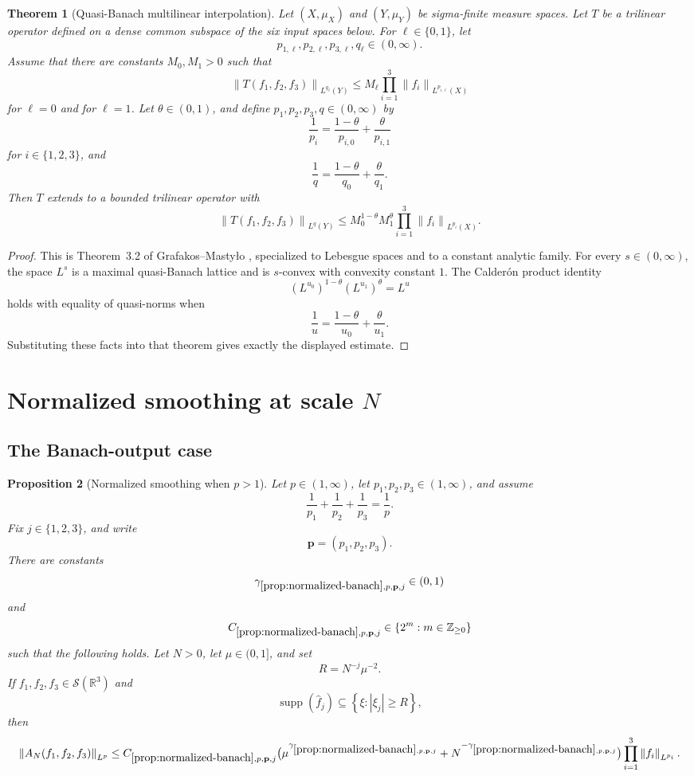 \documentclass[11pt]{article}
\newtheorem{theorem}{Theorem}[section]
\newtheorem{proposition}[theorem]{Proposition}
\newcommand{\R}{\mathbb{R}}
\newcommand{\Sch}{\mathcal{S}}
\newcommand{\supp}{\operatorname{supp}}
\newcommand{\norm}[2]{\left\lVert #1\right\rVert_{#2}}
\newcommand{\Cst}[2]{C_{\ref{#1},#2}}
\newcommand{\Gam}[2]{\gamma_{\ref{#1},#2}}
\newcommand{\abs}[1]{\left|#1\right|}
\newcommand{\set}[1]{\left\{#1\right\}}
\newcommand{\indices}{\{1,2,3\}}
\begin{document}
\begin{theorem}[Quasi-Banach multilinear interpolation]\label{thm:quasi-interpolation}
Let \((X,\mu_X)\) and \((Y,\mu_Y)\) be sigma-finite measure spaces.  Let \(T\) be a trilinear operator defined on a dense common subspace of the six input spaces below.  For \(\ell\in\{0,1\}\), let
\[
p_{1,\ell},p_{2,\ell},p_{3,\ell},q_\ell\in(0,\infty).
\]
Assume that there are constants \(M_0,M_1>0\) such that
\[
\norm{T(f_1,f_2,f_3)}{L^{q_\ell}(Y)}
\leq
M_\ell\prod_{i=1}^{3}\norm{f_i}{L^{p_{i,\ell}}(X)}
\]
for \(\ell=0\) and for \(\ell=1\).  Let \(\theta\in(0,1)\), and define \(p_1,p_2,p_3,q\in(0,\infty)\) by
\[
\frac1{p_i}=\frac{1-\theta}{p_{i,0}}+\frac\theta{p_{i,1}}
\]
for \(i\in\indices\), and
\[
\frac1q=\frac{1-\theta}{q_0}+\frac\theta{q_1}.
\]
Then \(T\) extends to a bounded trilinear operator with
\[
\norm{T(f_1,f_2,f_3)}{L^q(Y)}
\leq
M_0^{1-\theta}M_1^\theta
\prod_{i=1}^{3}\norm{f_i}{L^{p_i}(X)}.
\]
\end{theorem}

\begin{proof}
This is Theorem~3.2 of Grafakos--Masty\l o \cite[Theorem~3.2]{GrafakosMastylo}, specialized to Lebesgue spaces and to a constant analytic family.  For every \(s\in(0,\infty)\), the space \(L^s\) is a maximal quasi-Banach lattice and is \(s\)-convex with convexity constant \(1\).  The Calder\'on product identity
\[
(L^{u_0})^{1-\theta}(L^{u_1})^\theta=L^u
\]
holds with equality of quasi-norms when
\[
\frac1u=\frac{1-\theta}{u_0}+\frac\theta{u_1}.
\]
Substituting these facts into that theorem gives exactly the displayed estimate.
\end{proof}

\section{Normalized smoothing at scale \(N\)}

\subsection{The Banach-output case}

\begin{proposition}[Normalized smoothing when \(p>1\)]\label{prop:normalized-banach}
Let \(p\in(1,\infty)\), let \(p_1,p_2,p_3\in(1,\infty)\), and assume
\[
\frac1{p_1}+\frac1{p_2}+\frac1{p_3}=\frac1p.
\]
Fix \(j\in\indices\), and write
\[
\mathbf p=(p_1,p_2,p_3).
\]
There are constants
\[
\Gam{prop:normalized-banach}{p,\mathbf p,j}\in(0,1)
\]
and
\[
\Cst{prop:normalized-banach}{p,\mathbf p,j}\in\set{2^m:m\in\mathbb Z_{\geq0}}
\]
such that the following holds.  Let \(N>0\), let \(\mu\in(0,1]\), and set
\[
R=N^{-j}\mu^{-2}.
\]
If \(f_1,f_2,f_3\in\Sch(\R^3)\) and
\[
\supp(\widehat f_j)\subseteq\set{\xi:\abs{\xi_j}\geq R},
\]
then
\[
\norm{A_N(f_1,f_2,f_3)}{L^p}
\leq
\Cst{prop:normalized-banach}{p,\mathbf p,j}
\bigl(\mu^{\Gam{prop:normalized-banach}{p,\mathbf p,j}}
+N^{-\Gam{prop:normalized-banach}{p,\mathbf p,j}}\bigr)
\prod_{i=1}^{3}\norm{f_i}{L^{p_i}}.
\]
\end{proposition}
\end{document}
